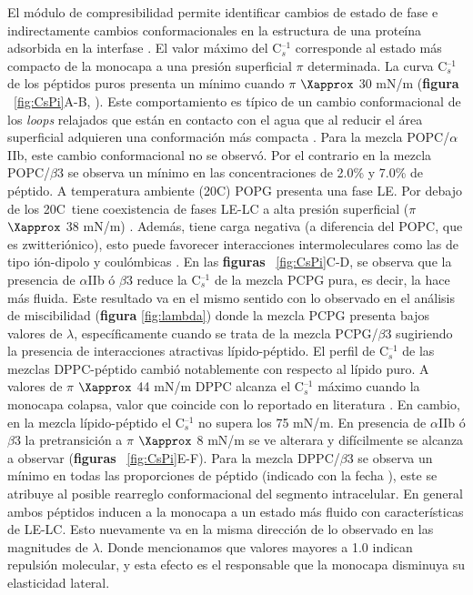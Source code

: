 El módulo de compresibilidad permite identificar cambios de estado de fase e indirectamente cambios conformacionales en la estructura de una proteína adsorbida en la interfase \citep{Elderdfi2018}. El valor máximo del C$_s^{\text{--}1}$ corresponde al estado más compacto de la monocapa a una presión superficial $\pi$ determinada. La curva C$_s^{\text{--}1}$ de los péptidos puros presenta un mínimo cuando $\pi$ $\Xapprox$ 30 mN/m (\textbf{figura} ~\ref{fig:CsPi}A-B, \textcolor{blue}{\faLongArrowRight}). Este comportamiento es típico de un cambio conformacional de los \textit{loops} relajados que están en contacto con el agua que al reducir el área superficial adquieren una conformación más compacta \citep{Toimil2012}. Para la mezcla POPC/$\alpha$IIb, este cambio conformacional no se observó. Por el contrario en la mezcla POPC/$\beta$3 se observa un mínimo en las concentraciones de 2.0\% y 7.0\% de péptido. A temperatura ambiente (20\textdegree C) POPG presenta una fase LE. Por debajo de los 20\textdegree C\, tiene coexistencia de fases LE-LC a alta presión superficial ($\pi$ $\Xapprox$ 38 mN/m) \citep{Takamoto2001}. 
Además, tiene carga negativa (a diferencia del POPC, que es zwitteriónico), esto puede favorecer interacciones intermoleculares como las de tipo ión-dipolo y coulómbicas \citep{Schmidt2022}. En las \textbf{figuras} ~\ref{fig:CsPi}C-D, se observa que la presencia de $\alpha$IIb ó $\beta$3 reduce la C$_s^{\text{--}1}$ de la mezcla PCPG pura, es decir, la hace más fluida. Este resultado va en el mismo sentido con lo observado en el análisis de miscibilidad (\textbf{figura} \ref{fig:lambda}) donde la mezcla PCPG presenta bajos valores de $\lambda$, específicamente cuando se trata de la mezcla PCPG/$\beta$3 sugiriendo la presencia de interacciones atractivas lípido-péptido.  
El perfil de C$_s^{\text{--}1}$ de las mezclas DPPC-péptido cambió notablemente con respecto al lípido puro. A valores de $\pi$ $\Xapprox$ 44 mN/m DPPC alcanza el C$_s^{\text{--}1}$ máximo cuando la monocapa colapsa, valor que coincide con lo reportado en literatura \citep{DeOliveiraPedro2020}. En cambio, en la mezcla lípido-péptido el C$_s^{\text{--}1}$  no supera los 75 mN/m. En presencia de $\alpha$IIb ó $\beta$3 la pretransición a $\pi$ $\Xapprox$ 8 mN/m se ve alterara y difícilmente se alcanza a observar (\textbf{figuras} ~\ref{fig:CsPi}E-F). Para la mezcla DPPC/$\beta$3 se observa un mínimo en todas las proporciones de péptido (indicado con la fecha \textcolor{blue}{\faLongArrowDown}), este se atribuye al posible rearreglo conformacional del segmento intracelular. En general ambos péptidos inducen a la monocapa a un estado más fluido con características de LE-LC. Esto nuevamente va en la misma dirección de lo observado en las magnitudes de $\lambda$. Donde mencionamos que valores mayores a 1.0 indican repulsión molecular, y esta efecto es el responsable que la monocapa disminuya su elasticidad lateral.

